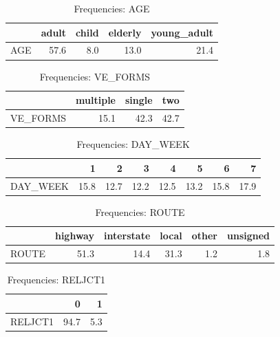 \begin{table}[ht]
\centering
\begin{tabular}{rrrrr}
  \toprule
 & adult & child & elderly & young\_adult \\ 
  \midrule
AGE & 57.6 & 8.0 & 13.0 & 21.4 \\ 
   \bottomrule
\end{tabular}
\caption{Frequencies: AGE} 
\end{table}
\begin{table}[ht]
\centering
\begin{tabular}{rrrr}
  \toprule
 & multiple & single & two \\ 
  \midrule
VE\_FORMS & 15.1 & 42.3 & 42.7 \\ 
   \bottomrule
\end{tabular}
\caption{Frequencies: VE_FORMS} 
\end{table}
\begin{table}[ht]
\centering
\begin{tabular}{rrrrrrrr}
  \toprule
 & 1 & 2 & 3 & 4 & 5 & 6 & 7 \\ 
  \midrule
DAY\_WEEK & 15.8 & 12.7 & 12.2 & 12.5 & 13.2 & 15.8 & 17.9 \\ 
   \bottomrule
\end{tabular}
\caption{Frequencies: DAY_WEEK} 
\end{table}
\begin{table}[ht]
\centering
\begin{tabular}{rrrrrr}
  \toprule
 & highway & interstate & local & other & unsigned \\ 
  \midrule
ROUTE & 51.3 & 14.4 & 31.3 & 1.2 & 1.8 \\ 
   \bottomrule
\end{tabular}
\caption{Frequencies: ROUTE} 
\end{table}
\begin{table}[ht]
\centering
\begin{tabular}{rrr}
  \toprule
 & 0 & 1 \\ 
  \midrule
RELJCT1 & 94.7 & 5.3 \\ 
   \bottomrule
\end{tabular}
\caption{Frequencies: RELJCT1} 
\end{table}
